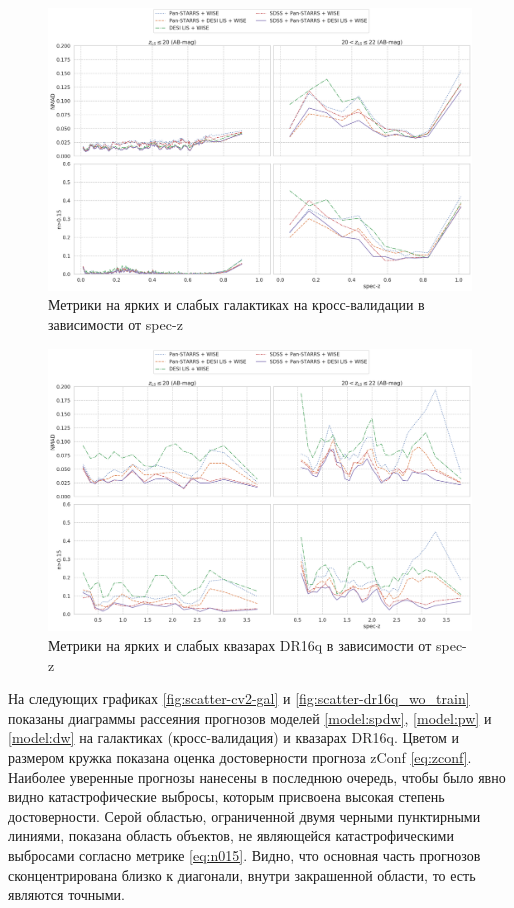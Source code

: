 \documentclass[fleqn,usenatbib]{mnras}
\begin{document}
\begin{figure}
    \centering
    \includegraphics[width=0.99\linewidth]{images/class-galaxy-cv2.png}
    \caption{Метрики на ярких и слабых галактиках на кросс-валидации в зависимости от spec-z}
    \label{fig:class-galaxy-cv2}
\end{figure}

\begin{figure}
    \centering
    \includegraphics[width=0.99\linewidth]{images/class-qso-dr16q.png}
    \caption{Метрики на ярких и слабых квазарах DR16q в зависимости от spec-z}
    \label{fig:class-qso-dr16q}
\end{figure}

На следующих графиках \ref{fig:scatter-cv2-gal} и \ref{fig:scatter-dr16q_wo_train} показаны диаграммы рассеяния прогнозов моделей \ref{model:spdw}, \ref{model:pw} и \ref{model:dw} на галактиках (кросс-валидация) и квазарах DR16q. Цветом и размером кружка показана оценка достоверности прогноза zConf \ref{eq:zconf}. Наиболее уверенные прогнозы нанесены в последнюю очередь, чтобы было явно видно катастрофические выбросы, которым присвоена высокая степень достоверности. Серой областью, ограниченной двумя черными пунктирными линиями, показана область объектов, не являющейся катастрофическими выбросами согласно метрике \ref{eq:n015}. Видно, что основная часть прогнозов сконцентрирована близко к диагонали, внутри закрашенной области, то есть являются точными.
\end{document}
